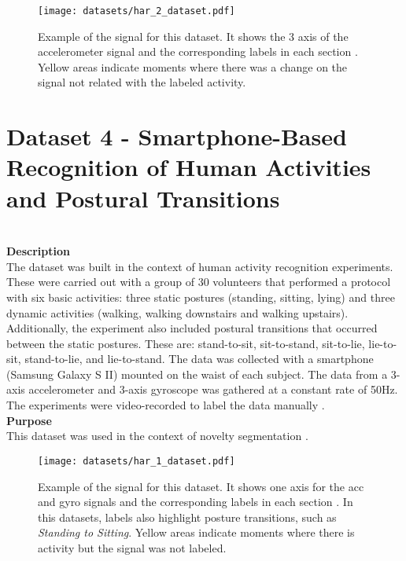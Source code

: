 \begin{figure}
\centering
\texttt{[image: datasets/har\_2\_dataset.pdf]}
\caption{Example of the signal for this dataset. It shows the 3 axis of the accelerometer signal and the corresponding labels in each section \cite{dataset2, dataset2_2}. Yellow areas indicate moments where there was a change on the signal not related with the labeled activity.}
\label{fig:har2_dataset}
\end{figure}
    
\section{Dataset 4 - Smartphone-Based Recognition of Human Activities and Postural Transitions}\\
\textbf{Description}\\
The dataset was built in the context of human activity recognition experiments. These were carried out with a group of 30 volunteers that performed a protocol with six basic activities: three static postures (standing, sitting, lying) and three dynamic activities (walking, walking downstairs and walking upstairs). Additionally, the experiment also included postural transitions that occurred between the static postures. These are: stand-to-sit, sit-to-stand, sit-to-lie, lie-to-sit, stand-to-lie, and lie-to-stand. The data was collected with a smartphone (Samsung Galaxy S II) mounted on the waist of each subject. The data from a 3-axis accelerometer and 3-axis gyroscope was gathered at a constant rate of 50Hz. The experiments were video-recorded to label the data manually \cite{dataset3}.\\
\textbf{Purpose}\\
This dataset was used in the context of novelty segmentation \cite{dataset3}.

\begin{figure}
\centering
\texttt{[image: datasets/har\_1\_dataset.pdf]}
\caption{Example of the signal for this dataset. It shows one axis for the \gls{acc} and \gls{gyro} signals and the corresponding labels in each section \cite{dataset3}. In this datasets, labels also highlight posture transitions, such as \textit{Standing to Sitting}. Yellow areas indicate moments where there is activity but the signal was not labeled.}
\label{fig:har1_dataset}
\end{figure}    
    
